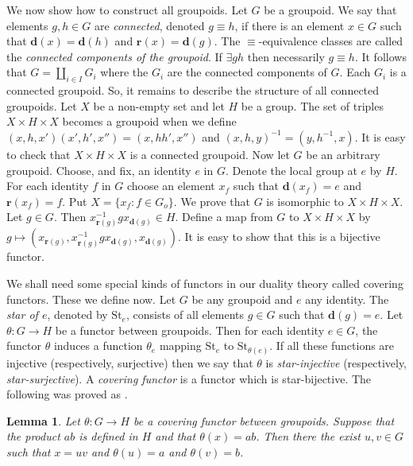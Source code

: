 \documentclass[a4paper]{amsart}
\newtheorem{lemma}[theorem]{Lemma}
\begin{document}
We now show how to construct all groupoids.
Let $G$ be a groupoid.
We say that elements $g,h \in G$ are {\em connected}, denoted $g \equiv h$, if there is an element $x \in G$ such that
$\mathbf{d}(x) = \mathbf{d}(h)$ and $\mathbf{r}(x) = \mathbf{d}(g)$.
The $\equiv$-equivalence classes are called the {\em connected components of the groupoid}.
If $\exists gh$ then necessarily $g \equiv h$.
It follows that $G = \coprod_{i \in I} G_{i}$ where the $G_{i}$ are the connected components of $G$.
Each $G_{i}$ is a connected groupoid.
So, it remains to describe the structure of all connected groupoids.
Let $X$ be a non-empty set and let $H$ be a group.
The set of triples $X \times H \times X$ becomes a groupoid when we define
$(x,h,x')(x',h',x'') = (x,hh',x'')$ and $(x,h,y)^{-1} = (y,h^{-1},x)$.
It is easy to check that $X \times H \times X$ is a connected groupoid.
Now let $G$ be an arbitrary groupoid.
Choose, and fix, an identity $e$ in $G$.
Denote the local group at $e$ by $H$.
For each identity $f$ in $G$ choose an element $x_{f}$ such that $\mathbf{d}(x_{f}) = e$ and $\mathbf{r}(x_{f}) = f$.
Put $X = \{x_{f} \colon f \in G_{o} \}$.
We prove that $G$ is isomorphic to $X \times H \times X$.
Let $g \in G$.
Then $x_{\mathbf{r}(g)}^{-1}gx_{\mathbf{d}(g)} \in H$.
Define a map from $G$ to $X \times H \times X$ by $g \mapsto (x_{\mathbf{r}(g)}, x_{\mathbf{r}(g)}^{-1}gx_{\mathbf{d}(g)}, x_{\mathbf{d}(g)})$.
It is easy to show that this is a bijective functor.

We shall need some special kinds of functors in our duality theory called
covering functors.
These we define now.
Let $G$ be any groupoid and $e$ any identity.
The {\em star of $e$}, denoted by $\mbox{St}_{e}$, 
consists of all elements $g \in G$ such that $\mathbf{d}(g) = e$.
Let $\theta \colon G \rightarrow H$ be a functor between groupoids.
Then for each identity $e \in G$, the functor $\theta$ induces a function
$\theta_{e}$ mapping $\mbox{St}_{e}$ to $\mbox{St}_{\theta (e)}$.
If all these functions are injective (respectively, surjective)
then we say that $\theta$ is {\em star-injective} (respectively, {\em star-surjective}).
A {\em covering functor} is a functor which is star-bijective.
The following was proved as \cite[Lemma 2.26]{Lawson3}.

\begin{lemma}\label{lem:former} Let $\theta \colon G \rightarrow H$ be a covering functor
between groupoids. Suppose that the product $ab$ is defined in $H$ and that $\theta (x) = ab$.
Then there the exist $u,v \in G$ such that $x = uv$ and $\theta (u) = a$ and $\theta (v) = b$.
\end{lemma}  
\end{document}
